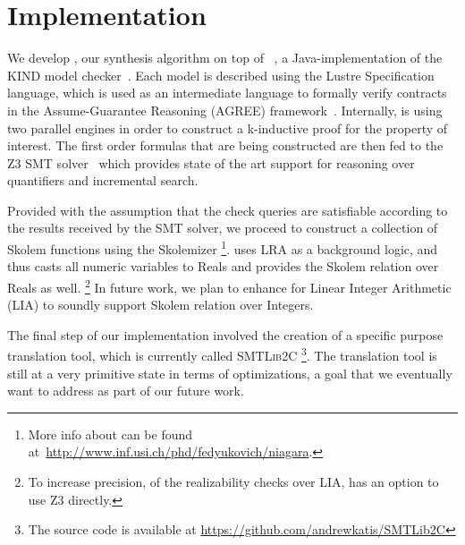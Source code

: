 \section{Implementation}
\label{sec:impl}

We develop \jkindsynt, our synthesis algorithm on top of \jkind~\cite{jkind},
a Java-implementation of the \textsc{KIND} model
checker~\cite{Hagen08:kind}. Each model is described using the Lustre
Specification language, which is used as an intermediate language to formally verify contracts in the
Assume-Guarantee Reasoning (\textsc{AGREE}) framework~\cite{NFM2012:CoGaMiWhLaLu}.
Internally, \jkind is using two parallel engines in order to construct a
k-inductive proof for the property of interest. The first order formulas that
are being constructed are then fed to the \textsc{Z3} SMT
solver~\cite{DeMoura08:z3} which provides state of the art support for reasoning
over quantifiers and incremental search.


Provided with the assumption that the check queries are satisfiable according to
the results received by the SMT solver, we proceed to construct a collection of
Skolem functions using the \aeval Skolemizer%
\footnote{More info about \aeval can be found at~\url{http://www.inf.usi.ch/phd/fedyukovich/niagara}.}.
\aeval  uses LRA as a background logic, and thus casts all numeric variables to Reals and provides the Skolem relation over Reals as well.%
\footnote{To increase precision, of the realizability checks over LIA, \jkind has an option to use \textsc{Z3} directly.}
In future work, we plan to enhance  \aeval for Linear Integer Arithmetic (LIA) to soundly support Skolem relation over Integers.

The final step of our implementation involved the creation of a specific purpose
translation tool, which is currently called \textsc{SMTLib2C}%
\footnote{The source code
is available at \url{https://github.com/andrewkatis/SMTLib2C}}. The translation tool
is still at a very primitive state in terms of optimizations, a goal that we
eventually want to address as part of our future work.


